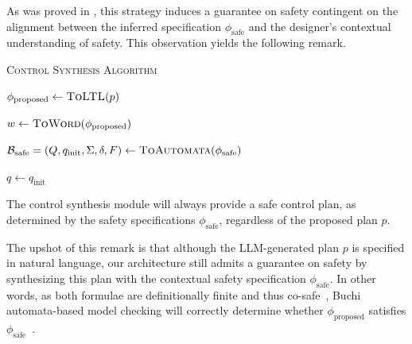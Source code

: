 As was proved in \cite{tuumova2013minimumviolationltl}, this strategy induces a guarantee on safety contingent on the alignment between the inferred specification $\phi_\text{safe}$ and the designer's contextual understanding of safety. This observation yields the following remark.


\begin{algorithm}[t]
\caption{\textsc{Control Synthesis Algorithm}}
\label{alg:control_synthesis}



$\phi_{\text{proposed}} \leftarrow \textsc{ToLTL}(p)$

$w \leftarrow \textsc{ToWord}(\phi_{\text{proposed}})$

$\mathcal{B}_{\text{safe}} = (Q, q_\text{init}, \Sigma, \delta, F) \leftarrow \textsc{ToAutomata}(\phi_{\text{safe}})$

$q \leftarrow q_{\text{init}}$


\end{algorithm}

\begin{remark} 
\label{remark}
The control synthesis module will always provide a safe control plan, as determined by the safety specifications $\phi_{\text{safe}}$, regardless of the proposed plan $p$.
\end{remark}
%
\noindent The upshot of this remark is that although the LLM-generated plan $p$ is specified in natural language, our architecture still admits a guarantee on safety by synthesizing this plan with the contextual safety specification $\phi_\text{safe}$.  In other words, as both formulae are definitionally finite and thus co-safe~\cite{kupferman2001model}, Buchi automata-based model checking will correctly determine whether $\phi_{\text{proposed}}$ satisfies $\phi_{\text{safe}}$~\cite{model_checking_book}.
